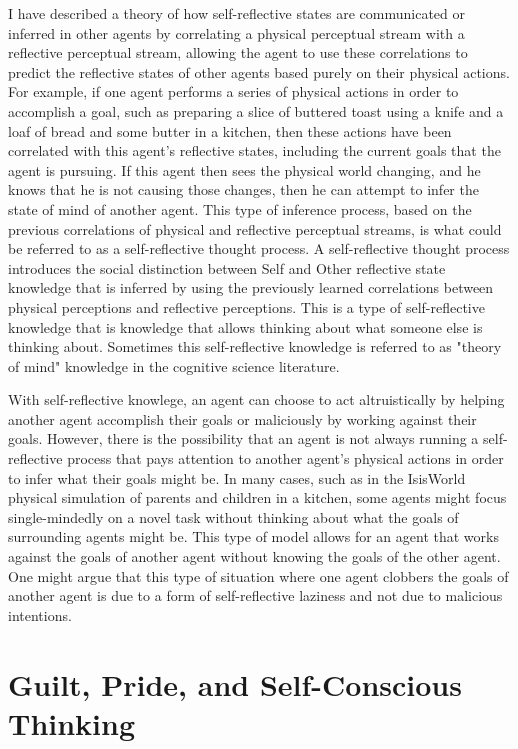 I have described \cite[]{morgan:2011} a theory of how self-reflective
states are communicated or inferred in other agents by correlating a
physical perceptual stream with a reflective perceptual stream,
allowing the agent to use these correlations to predict the reflective
states of other agents based purely on their physical actions. For
example, if one agent performs a series of physical actions in order
to accomplish a goal, such as preparing a slice of buttered toast
using a knife and a loaf of bread and some butter in a kitchen, then
these actions have been correlated with this agent's reflective
states, including the current goals that the agent is pursuing. If
this agent then sees the physical world changing, and he knows that he
is not causing those changes, then he can attempt to infer the state
of mind of another agent. This type of inference process, based on the
previous correlations of physical and reflective perceptual streams,
is what could be referred to as a self-reflective thought process. A
self-reflective thought process introduces the social distinction
between Self and Other reflective state knowledge that is inferred by
using the previously learned correlations between physical perceptions
and reflective perceptions.  This is a type of self-reflective
knowledge that is knowledge that allows thinking about what someone
else is thinking about.  Sometimes this self-reflective knowledge is
referred to as "theory of mind" knowledge in the cognitive science
literature.

With self-reflective knowlege, an agent can choose to act
altruistically by helping another agent accomplish their goals or
maliciously by working against their goals. However, there is the
possibility that an agent is not always running a self-reflective
process that pays attention to another agent's physical actions in
order to infer what their goals might be. In many cases, such as in
the IsisWorld physical simulation of parents and children in a
kitchen, some agents might focus single-mindedly on a novel task
without thinking about what the goals of surrounding agents might
be. This type of model allows for an agent that works against the
goals of another agent without knowing the goals of the other
agent. One might argue that this type of situation where one agent
clobbers the goals of another agent is due to a form of
self-reflective laziness and not due to malicious intentions.

\section{Guilt, Pride, and Self-Conscious Thinking}

